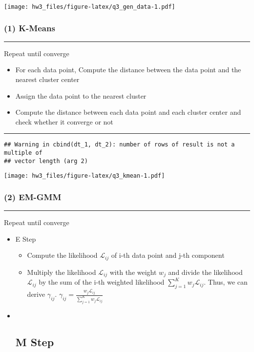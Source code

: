 \documentclass[
]{article}
\providecommand{\tightlist}{%
  \setlength{\itemsep}{0pt}\setlength{\parskip}{0pt}}
\begin{document}
\texttt{[image: hw3\_files/figure-latex/q3\_gen\_data-1.pdf]}

\hypertarget{k-means}{%
\subsubsection{(1) K-Means}\label{k-means}}

\begin{center}\rule{0.5\linewidth}{0.5pt}\end{center}

Repeat until converge

\begin{itemize}
\item
  For each data point, Compute the distance between the data point and
  the nearest cluster center
\item
  Assign the data point to the nearest cluster
\item
  Compute the distance between each data point and each cluster center
  and check whether it converge or not
\end{itemize}

\begin{center}\rule{0.5\linewidth}{0.5pt}\end{center}

\begin{verbatim}
## Warning in cbind(dt_1, dt_2): number of rows of result is not a multiple of
## vector length (arg 2)
\end{verbatim}

\texttt{[image: hw3\_files/figure-latex/q3\_kmean-1.pdf]}

\hypertarget{em-gmm}{%
\subsubsection{(2) EM-GMM}\label{em-gmm}}

\begin{center}\rule{0.5\linewidth}{0.5pt}\end{center}

Repeat until converge

\begin{itemize}
\item
  E Step

  \begin{itemize}
  \tightlist
  \item
    Compute the likelihood \(\mathcal{L}_{ij}\) of i-th data point and
    j-th component
  \item
    Multiply the likelihood \(\mathcal{L}_{ij}\) with the weight
    \(w_{j}\) and divide the likelihood \(\mathcal{L}_{ij}\) by the sum
    of the i-th weighted likelihood
    \(\sum_{j=1}^K w_{j} \mathcal{L}_{ij}\). Thus, we can derive
    \(\gamma_{ij}\).
    \(\gamma_{ij} = \frac{w_{j} \mathcal{L}_{ij}}{\sum_{j=1}^K w_{j} \mathcal{L}_{ij}}\)
  \end{itemize}
\item ~
  \hypertarget{m-step}{%
  \subsection{M Step}\label{m-step}}
\end{itemize}
\end{document}
